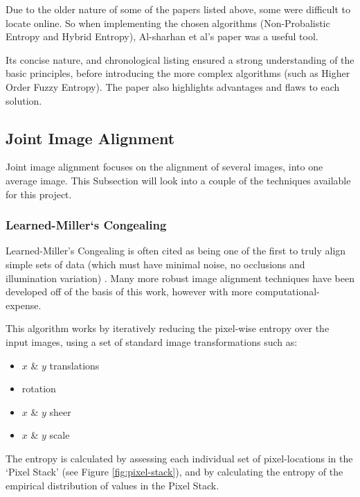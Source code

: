 Due to the older nature of some of the papers listed above, some were difficult to locate online. So when implementing the chosen algorithms (Non-Probalistic Entropy and Hybrid Entropy), Al-sharhan et al's paper  \cite{Al-Sharhan_Karray_Gueaieb_Basir_2001} was a useful tool.

Its concise nature, and chronological listing ensured a strong understanding of the basic principles, before introducing the more complex algorithms (such as Higher Order Fuzzy Entropy). The paper also highlights advantages and flaws to each solution.

\subsection{Joint Image Alignment}

Joint image alignment focuses on the alignment of several images, into one average image. This Subsection will look into a couple of the techniques available for this project.

\subsubsection{Learned-Miller`s Congealing}

Learned-Miller's \Gls{Congealing} \cite{joint-alignment} is often cited as being one of the first to truly align simple sets of data (which must have minimal noise, no occlusions and illumination variation) \cite{Zhou_Lee_Yu_Efros_2015} \cite{peng2012rasl} \cite{Peng_Ganesh_Wright_Xu_Ma_2012}. Many more robust image alignment techniques have been developed off of the basis of this work, however with more computational-expense.

This algorithm works by iteratively reducing the pixel-wise entropy over the input images, using a set of standard image transformations such as:

\begin{itemize}
  \item $x$ \& $y$ translations
  \item rotation
  \item $x$ \& $y$ sheer
  \item $x$ \& $y$ scale
\end{itemize}

The entropy is calculated by assessing each individual set of pixel-locations in the `Pixel Stack' (see Figure \ref{fig:pixel-stack}), and by calculating the entropy of the empirical distribution of values in the Pixel Stack.

